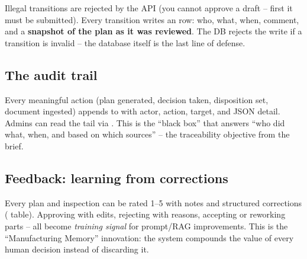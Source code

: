 \begin{center}
\end{center}

Illegal transitions are rejected by the API (you cannot approve a draft -- first it
must be submitted). Every transition writes an  row: who, what,
when, comment, and a \textbf{snapshot of the plan as it was reviewed}. The DB rejects
the write if a transition is invalid -- the database itself is the last line of defense.

\subsection{The audit trail}
Every meaningful action (plan generated, decision taken, disposition set, document
ingested) appends to  with actor, action, target, and JSON
detail. Admins can read the tail via . This is the
``black box'' that answers ``who did what, when, and based on which sources'' -- the
traceability objective from the brief.

\subsection{Feedback: learning from corrections}
Every plan and inspection can be rated 1--5 with notes and structured corrections
( table). Approving with edits, rejecting with reasons, accepting
or reworking parts -- all become \emph{training signal} for prompt/RAG improvements.
This is the ``Manufacturing Memory'' innovation: the system compounds the value of
every human decision instead of discarding it.

